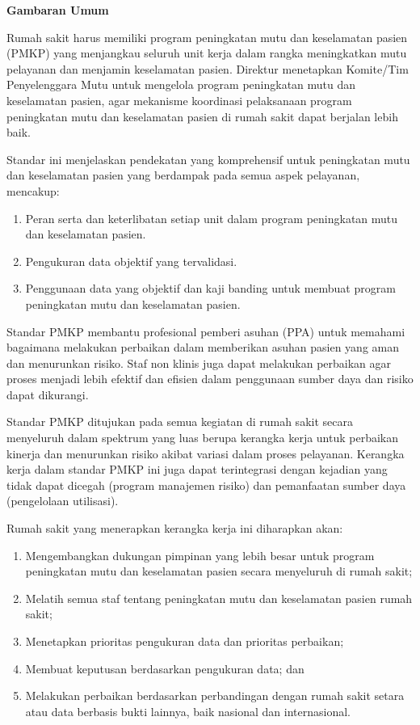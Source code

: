 \documentclass[
]{book}
\providecommand{\tightlist}{%
  \setlength{\itemsep}{0pt}\setlength{\parskip}{0pt}}
\begin{document}
\textbf{Gambaran Umum}

Rumah sakit harus memiliki program peningkatan mutu dan keselamatan pasien (PMKP) yang menjangkau seluruh unit kerja dalam rangka meningkatkan mutu pelayanan dan menjamin keselamatan pasien. Direktur menetapkan Komite/Tim Penyelenggara Mutu untuk mengelola program peningkatan mutu dan keselamatan pasien, agar mekanisme koordinasi pelaksanaan program peningkatan mutu dan keselamatan pasien di rumah sakit dapat berjalan lebih baik.

Standar ini menjelaskan pendekatan yang komprehensif untuk peningkatan mutu dan keselamatan pasien yang berdampak pada semua aspek pelayanan, mencakup:

\begin{enumerate}
\def\labelenumi{\alph{enumi}.}
\tightlist
\item
  Peran serta dan keterlibatan setiap unit dalam program peningkatan mutu dan keselamatan pasien.
\item
  Pengukuran data objektif yang tervalidasi.
\item
  Penggunaan data yang objektif dan kaji banding untuk membuat program peningkatan mutu dan keselamatan pasien.
\end{enumerate}

Standar PMKP membantu profesional pemberi asuhan (PPA) untuk memahami bagaimana melakukan perbaikan dalam memberikan asuhan pasien yang aman dan menurunkan risiko. Staf non klinis juga dapat melakukan perbaikan agar proses menjadi lebih efektif dan efisien dalam penggunaan sumber daya dan risiko dapat dikurangi.

Standar PMKP ditujukan pada semua kegiatan di rumah sakit secara menyeluruh dalam spektrum yang luas berupa kerangka kerja untuk perbaikan kinerja dan menurunkan risiko akibat variasi dalam proses pelayanan. Kerangka kerja dalam standar PMKP ini juga dapat terintegrasi dengan kejadian yang tidak dapat dicegah (program manajemen risiko) dan pemanfaatan sumber daya (pengelolaan utilisasi).

Rumah sakit yang menerapkan kerangka kerja ini diharapkan akan:

\begin{enumerate}
\def\labelenumi{\alph{enumi}.}
\tightlist
\item
  Mengembangkan dukungan pimpinan yang lebih besar untuk program peningkatan mutu dan keselamatan pasien secara menyeluruh di rumah sakit;
\item
  Melatih semua staf tentang peningkatan mutu dan keselamatan pasien rumah sakit;
\item
  Menetapkan prioritas pengukuran data dan prioritas perbaikan;
\item
  Membuat keputusan berdasarkan pengukuran data; dan
\item
  Melakukan perbaikan berdasarkan perbandingan dengan rumah sakit setara atau data berbasis bukti lainnya, baik nasional dan internasional.
\end{enumerate}
\end{document}
